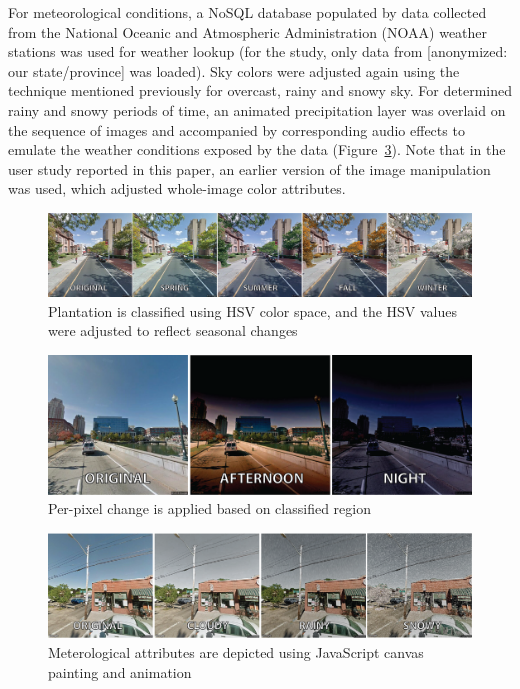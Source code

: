 \documentclass{sigchi}
\begin{document}
For meteorological conditions, a NoSQL database populated by data collected from the National Oceanic and Atmospheric Administration (NOAA) weather stations was used for weather lookup (for the study, only data from [anonymized: our state/province] was loaded). Sky colors were adjusted again using the technique mentioned previously for overcast, rainy and snowy sky. For determined rainy and snowy periods of time, an animated precipitation layer was overlaid on the sequence of images and accompanied by corresponding audio effects to emulate the weather conditions exposed by the data (Figure~\ref{fig:weather}). Note that in the user study reported in this paper, an earlier version of the image manipulation was used, which adjusted whole-image color attributes.


\begin{figure}
   \centering
     \includegraphics[width=1\linewidth]{Rewind-seasons2}
     \caption{Plantation is classified using HSV color space, and the HSV values were adjusted to reflect seasonal changes}
     \label{fig:season}
\end{figure}

\begin{figure}
   \centering
     \includegraphics[width=1\linewidth]{Rewind-time_of_day2}
     \caption{Per-pixel change is applied based on classified region}
     \label{fig:timeofday}
\end{figure}

\begin{figure}
   \centering
     \includegraphics[width=1\linewidth]{Rewind-weather}
     \caption{Meterological attributes are depicted using JavaScript canvas painting and animation}
     \label{fig:weather}
\end{figure}
\end{document}
